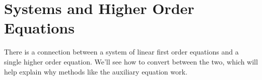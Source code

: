 \section{Systems and Higher Order Equations}
There is a connection between a system of linear first order equations and a single higher order equation. We'll see how to convert between the two, which will help explain why methods like the auxiliary equation work.


